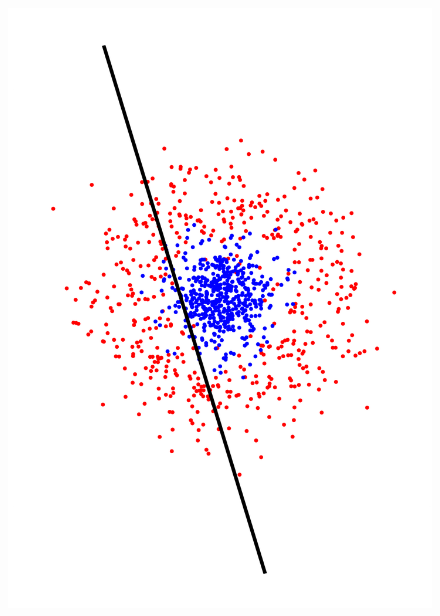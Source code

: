 \begin{figure}
\begin{center}
 \includegraphics[angle=270, scale=0.166]{ch4/figures/60.pdf}\\

\end{center}
\end{figure}
